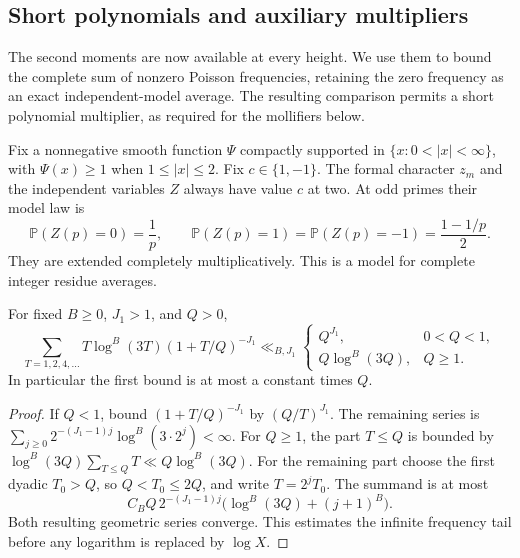 \subsection{Short polynomials and auxiliary multipliers}

The second moments are now available at every height. We use them to
bound the complete sum of nonzero Poisson frequencies, retaining the
zero frequency as an exact independent-model average. The resulting
comparison permits a short polynomial multiplier, as required for the
mollifiers below.

Fix a nonnegative smooth function $\Psi$ compactly supported in
$\{x:0<|x|<\infty\}$, with $\Psi(x)\geq1$ when $1\leq|x|\leq2$.
Fix $c\in\{1,-1\}$. The formal character $z_m$ and the independent
variables $Z$ always have value $c$ at two. At odd primes their model
law is
\[
 \mathbb P(Z(p)=0)=\frac1p,\qquad
 \mathbb P(Z(p)=1)=\mathbb P(Z(p)=-1)=\frac{1-1/p}{2}.
\]
They are extended completely multiplicatively. This is a model for
complete integer residue averages.

\begin{lemma}\label{analytic:frequency-sum}
For fixed $B\geq0$, $J_1>1$, and $Q>0$,
\begin{equation}\label{analytic:dyadic-frequency-bound}
 \sum_{T=1,2,4,\ldots}T\log^B(3T)(1+T/Q)^{-J_1}
 \ll_{B,J_1}
 \begin{cases}
 Q^{J_1},&0<Q<1,\\
 Q\log^B(3Q),&Q\geq1.
 \end{cases}
\end{equation}
In particular the first bound is at most a constant times $Q$.
\end{lemma}

\begin{proof}
If $Q<1$, bound $(1+T/Q)^{-J_1}$ by $(Q/T)^{J_1}$.
The remaining series is
$\sum_{j\geq0}2^{-(J_1-1)j}\log^B(3\cdot2^j)<\infty$.
For $Q\geq1$, the part $T\leq Q$ is bounded by
$\log^B(3Q)\sum_{T\leq Q}T\ll Q\log^B(3Q)$.
For the remaining part choose the first dyadic $T_0>Q$, so
$Q<T_0\leq2Q$, and write $T=2^jT_0$. The summand is at most
\[
 C_B Q\,2^{-(J_1-1)j}
       \big(\log^B(3Q)+(j+1)^B\big).
\]
Both resulting geometric series converge. This estimates the infinite
frequency tail before any logarithm is replaced by $\log X$.
\end{proof}

